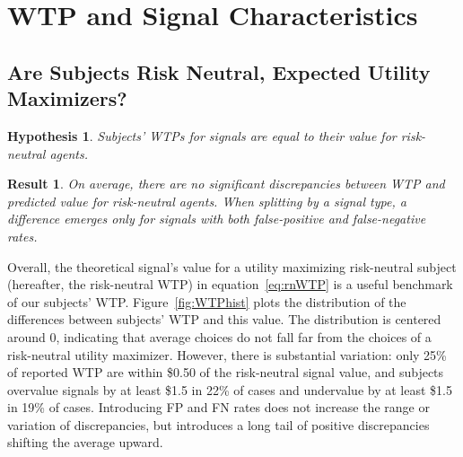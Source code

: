 \documentclass[12pt,a4paper]{article}
\newtheorem{hypothesis}{Hypothesis}
\newtheorem{result}{Result}
\begin{document}
\vspace{20pt}

\section{WTP and Signal Characteristics}\label{sec:results}

\subsection{Are Subjects Risk Neutral, Expected Utility Maximizers?} 

\begin{hypothesis}\label{hyp:eqRN} 
Subjects' WTPs for signals are equal to their value for risk-neutral agents. 
\end{hypothesis}

\begin{result} 
On average, there are no significant discrepancies between WTP and predicted value for risk-neutral agents. When splitting by a signal type, a difference emerges only for signals with both false-positive and false-negative rates.
\end{result}


Overall, the theoretical signal's value for a utility maximizing risk-neutral subject (hereafter, the risk-neutral WTP) in equation~\ref{eq:rnWTP} is a useful benchmark of our subjects' WTP. Figure~\ref{fig:WTPhist} plots the distribution of the differences between subjects' WTP and this value.  
The distribution is centered around 0, indicating that average choices do not fall far from the choices of a risk-neutral utility maximizer. However, there is substantial variation: only 25\% of reported WTP are within \$0.50 of the risk-neutral signal value, and subjects overvalue signals by at least \$1.5 in 22\% of cases and undervalue by at least \$1.5 in 19\% of cases. Introducing FP and FN rates does not increase the range or variation of discrepancies, but introduces a long tail of positive discrepancies shifting the average upward.
\end{document}
